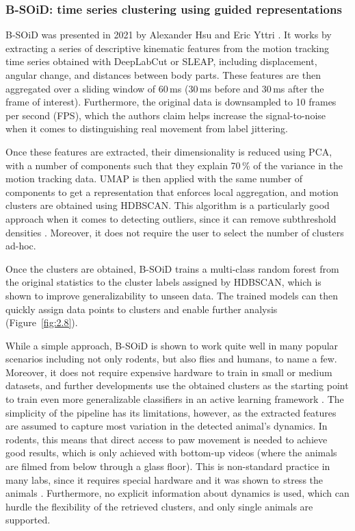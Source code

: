 \subsubsection{B-SOiD: time series clustering using guided representations}

B-SOiD was presented in 2021 by Alexander Hsu and Eric Yttri \cite{Hsu2021B-SOiDBehaviors}. It works by extracting a series of descriptive kinematic features from the motion tracking time series obtained with DeepLabCut or SLEAP, including displacement, angular change, and distances between body parts. These features are then aggregated over a sliding window of 60\,ms (30\,ms before and 30\,ms after the frame of interest). Furthermore, the original data is downsampled to 10 frames per second (FPS), which the authors claim helps increase the signal-to-noise when it comes to distinguishing real movement from label jittering.

Once these features are extracted, their dimensionality is reduced using PCA, with a number of components such that they explain 70\,\% of the variance in the motion tracking data. UMAP is then applied with the same number of components to get a representation that enforces local aggregation, and motion clusters are obtained using HDBSCAN. This algorithm is a particularly good approach when it comes to detecting outliers, since it can remove subthreshold densities \cite{McInnes2017Hdbscan:Clustering}. Moreover, it does not require the user to select the number of clusters ad-hoc.

Once the clusters are obtained, B-SOiD trains a multi-class random forest from the original statistics to the cluster labels assigned by HDBSCAN, which is shown to improve generalizability to unseen data. The trained models can then quickly assign data points to clusters and enable further analysis (Figure~\ref{fig:2.8}).

While a simple approach, B-SOiD is shown to work quite well in many popular scenarios including not only rodents, but also flies and humans, to name a few. Moreover, it does not require expensive hardware to train in small or medium datasets, and further developments use the obtained clusters as the starting point to train even more generalizable classifiers in an active learning framework \cite{Schweihoff2022A-SOiDBehavior}. The simplicity of the pipeline has its limitations, however, as the extracted features are assumed to capture most variation in the detected animal's dynamics. In rodents, this means that direct access to paw movement is needed to achieve good results, which is only achieved with bottom-up videos (where the animals are filmed from below through a glass floor). This is non-standard practice in many labs, since it requires special hardware and it was shown to stress the animals \cite{Miranda2023IncreasingBehaviors}. Furthermore, no explicit information about dynamics is used, which can hurdle the flexibility of the retrieved clusters, and only single animals are supported.

